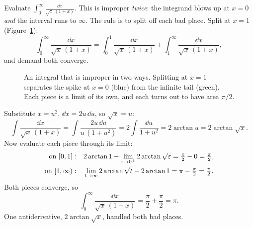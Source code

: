 \begin{example}
\label{ch25:ex-double-improper}
Evaluate $\displaystyle\int_0^{\infty}\frac{\dd x}{\sqrt{x}\,(1+x)}$. This is
improper \emph{twice}: the integrand blows up at $x=0$ \emph{and} the interval runs
to $\infty$. The rule is to split off each bad place. Split at $x=1$
(Figure~\ref{ch25:fig-double-improper}):
\[
  \int_0^{\infty}\frac{\dd x}{\sqrt x\,(1+x)}
  = \int_0^{1}\frac{\dd x}{\sqrt x\,(1+x)} + \int_1^{\infty}\frac{\dd x}{\sqrt x\,(1+x)},
\]
and demand both converge.

\begin{figure}[htbp]
\centering
{}
\caption{An integral that is improper in two ways. Splitting at $x=1$ separates
the spike at $x=0$ (blue) from the infinite tail (green). Each piece is a limit
of its own, and each turns out to have area $\pi/2$.}
\label{ch25:fig-double-improper}
\end{figure}

Substitute $x = u^2$, $\dd x = 2u\,\dd u$, so
$\sqrt x = u$:
\[
  \int \frac{\dd x}{\sqrt x\,(1+x)}
  = \int \frac{2u\,\dd u}{u\,(1+u^2)}
  = 2\int \frac{\dd u}{1+u^2}
  = 2\arctan u = 2\arctan\sqrt x.
\]
Now evaluate each piece through its limit:
\begin{align*}
  \text{on } [0,1]:&\quad 2\arctan 1 - \lim_{\varepsilon\to 0^+}2\arctan\sqrt{\varepsilon}
    = \tfrac{\pi}{2} - 0 = \tfrac{\pi}{2},\\
  \text{on } [1,\infty):&\quad \lim_{t\to\infty}2\arctan\sqrt t - 2\arctan 1
    = \pi - \tfrac{\pi}{2} = \tfrac{\pi}{2}.
\end{align*}
Both pieces converge, so
\[
  \int_0^{\infty}\frac{\dd x}{\sqrt x\,(1+x)} = \frac{\pi}{2} + \frac{\pi}{2} = \pi.
\]
One antiderivative, $2\arctan\sqrt x$, handled both bad places.
\end{example}

